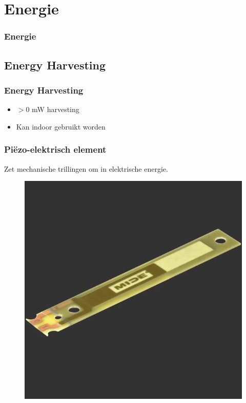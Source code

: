 \section{Energie}
\begin{frame}
    \frametitle{Energie}
\end{frame}
    \subsection{Energy Harvesting}
    \begin{frame}
        \frametitle{Energy Harvesting}
        \begin{itemize}
            \item $>$0 mW harvesting
            \item Kan indoor gebruikt worden
        \end{itemize}

    \end{frame}


    \begin{frame}
        \frametitle{Piëzo-elektrisch element}
    
        Zet mechanische trillingen om in elektrische energie.
        \begin{figure}[h]
            \raggedright
            \includegraphics[scale=0.2]{img/peizo.png}
        \end{figure}


    
    \end{frame}

